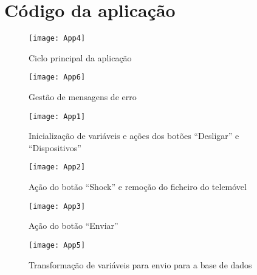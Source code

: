 \chapter{Código da aplicação}
\label{cha:codigo_da_aplicacao}

\begin{figure}[hbtp]
	\centering
	\texttt{[image: App4]}
	\caption{Ciclo principal da aplicação}
	\label{fig:App4}
\end{figure}

\begin{figure}[hbtp]
	\centering
	\texttt{[image: App6]}
	\caption{Gestão de mensagens de erro}
	\label{fig:App6}
\end{figure}

\begin{figure}[hbtp]
	\centering
	\texttt{[image: App1]}
	\caption{Inicialização de variáveis e ações dos botões ``Desligar'' e ``Dispositivos''}
	\label{fig:App1}
\end{figure}

\begin{figure}[hbtp]
	\centering
	\texttt{[image: App2]}
	\caption{Ação do botão ``Shock'' e remoção do ficheiro do telemóvel}
	\label{fig:App2}
\end{figure}

\begin{figure}[hbtp]
	\centering
	\texttt{[image: App3]}
	\caption{Ação do botão ``Enviar''}
	\label{fig:App3}
\end{figure}

\begin{figure}[hbtp]
	\centering
	\texttt{[image: App5]}
	\caption{Transformação de variáveis para envio para a base de dados}
	\label{fig:App5}
\end{figure}

